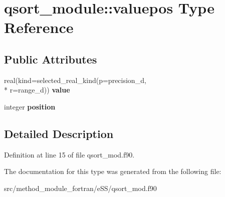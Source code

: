 \hypertarget{structqsort__module_1_1valuepos}{\section{qsort\-\_\-module\-:\-:valuepos Type Reference}
\label{structqsort__module_1_1valuepos}
}
\subsection*{Public Attributes}
\begin{DoxyCompactItemize}
\item 
\hypertarget{structqsort__module_1_1valuepos_a6b4df8a58d424011ebdf71440579a731}{real(kind=selected\-\_\-real\-\_\-kind(p=precision\-\_\-d, \\*
r=range\-\_\-d)) {\bfseries value}}\label{structqsort__module_1_1valuepos_a6b4df8a58d424011ebdf71440579a731}

\item 
\hypertarget{structqsort__module_1_1valuepos_abdcd4cd657a4276486b7d8f17cb4a0ed}{integer {\bfseries position}}\label{structqsort__module_1_1valuepos_abdcd4cd657a4276486b7d8f17cb4a0ed}

\end{DoxyCompactItemize}


\subsection{Detailed Description}


Definition at line 15 of file qsort\-\_\-mod.\-f90.



The documentation for this type was generated from the following file\-:\begin{DoxyCompactItemize}
\item 
src/method\-\_\-module\-\_\-fortran/e\-S\-S/qsort\-\_\-mod.\-f90\end{DoxyCompactItemize}
